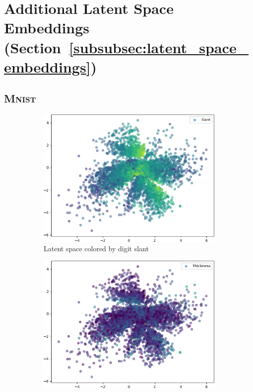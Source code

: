 \documentclass[11pt,a4paper]{article}
\let\oldsection\section
\renewcommand\section{\clearpage\oldsection}
\begin{document}
\pagebreak
\section{Additional Latent Space Embeddings (Section~\ref{subsubsec:latent_space_embeddings})}
\subsection{\textsc{Mnist}}
\begin{figure}[H]
\centering
\begin{subfigure}{.32\textwidth}
\includegraphics[width=\textwidth]{images/latent_spaces/mnist/vae_gan/embeddings_mu_0.png}
\caption{Latent space colored by digit slant}
\label{subfig:vae_mnist_latent_space_slant}
\end{subfigure}
\hfill
\begin{subfigure}{.32\textwidth}
\includegraphics[width=\textwidth]{images/latent_spaces/mnist/vae_gan/embeddings_mu_1.png}

\end{subfigure}
\end{figure}
\end{document}
